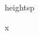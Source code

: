 \documentclass{article}
\begin{document}
\vrule height\pdfrandomseed sp\par
\clearpage
x
\gdef\SatexReachedEnd{}
\end{document}

